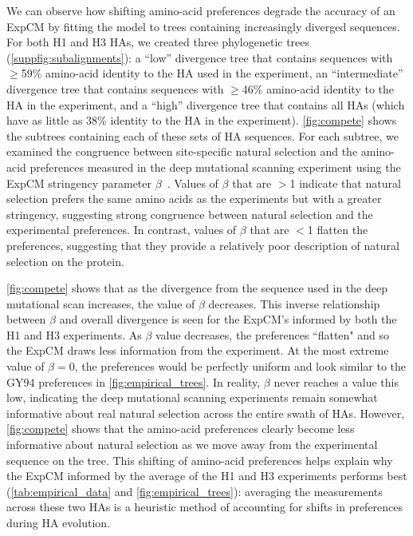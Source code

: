 \documentclass[11pt]{article}
\begin{document}
We can observe how shifting amino-acid preferences degrade the accuracy of an ExpCM by fitting the model to trees containing increasingly diverged sequences.
For both H1 and H3 HAs, we created three phylogenetic trees (\ref{suppfig:subalignments}): a ``low'' divergence tree that contains sequences with $\ge$59\% amino-acid identity to the HA used in the experiment, an ``intermediate'' divergence tree that contains sequences with $\ge$46\% amino-acid identity to the HA in the experiment, and a ``high'' divergence tree that contains all HAs (which have as little as 38\% identity to the HA in the experiment).
\ref{fig:compete} shows the subtrees containing each of these sets of HA sequences.
For each subtree, we examined the congruence between site-specific natural selection and the amino-acid preferences measured in the deep mutational scanning experiment using the ExpCM stringency parameter $\beta$~\citep{bloom2014informed,hilton2017phydms}. 
Values of $\beta$ that are $>$1 indicate that natural selection prefers the same amino acids as the experiments but with a greater stringency, suggesting strong congruence between natural selection and the experimental preferences. 
In contrast, values of $\beta$ that are $<$1 flatten the preferences, suggesting that they provide a relatively poor description of natural selection on the protein.

\ref{fig:compete} shows that as the divergence from the sequence used in the deep mutational scan increases, the value of $\beta$ decreases. 
This inverse relationship between $\beta$ and overall divergence is seen for the ExpCM's informed by both the H1 and H3 experiments.
As $\beta$ value decreases, the preferences ``flatten" and so the ExpCM draws less information from the experiment. 
At the most extreme value of $\beta = 0$, the preferences would be perfectly uniform and look similar to the GY94 preferences in \ref{fig:empirical_trees}.
In reality, $\beta$ never reaches a value this low, indicating the deep mutational scanning experiments remain somewhat informative about real natural selection across the entire swath of HAs. 
However, \ref{fig:compete} shows that the amino-acid preferences clearly become less informative about natural selection as we move away from the experimental sequence on the tree.
This shifting of amino-acid preferences helps explain why the ExpCM informed by the average of the H1 and H3 experiments performs best (\ref{tab:empirical_data} and \ref{fig:empirical_trees}): averaging the measurements across these two HAs is a heuristic method of accounting for shifts in preferences during HA evolution. 
 
\end{document}
